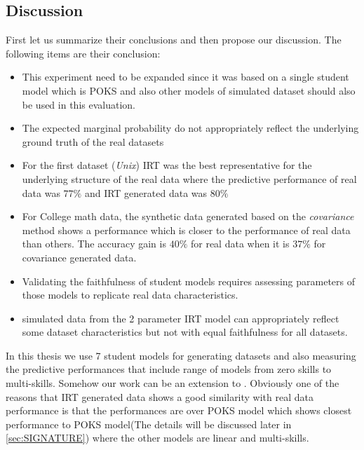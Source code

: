 \subsection{Discussion}

First let us summarize their conclusions and then propose our discussion. The following items are their conclusion:
\begin{itemize}
\item This experiment need to be expanded since it was based on a single student model which is POKS and also other models of simulated dataset should also be used in this evaluation.
\item The expected marginal probability do not appropriately reflect the underlying ground truth of the real datasets
\item For the first dataset (\textit{Unix}) IRT was the best representative for the underlying structure of the real data where the predictive performance of real data was $77\%$ and IRT generated data was $80\%$
\item For College math data, the synthetic data generated based on the \textit{covariance} method shows a performance which is closer to the performance of real data than others. The accuracy gain is $40\%$ for real data when it is $37\%$ for covariance generated data.

\item Validating the faithfulness of student models requires assessing parameters of those models to replicate real data characteristics.

\item simulated data from the 2 parameter IRT model can appropriately reflect some dataset characteristics but not with equal faithfulness for all datasets.
 
\end{itemize}

In this thesis we use 7 student models for generating datasets and also measuring the predictive performances that include range of models from zero skills to multi-skills. Somehow our work can be an extension to \citep{Desmarais2010}. Obviously one of the reasons that  IRT generated data shows a good similarity with real data performance is that the performances are over POKS model which shows closest performance to POKS model(The details will be discussed later in \ref{sec:SIGNATURE}) where the other models are linear and multi-skills. 


